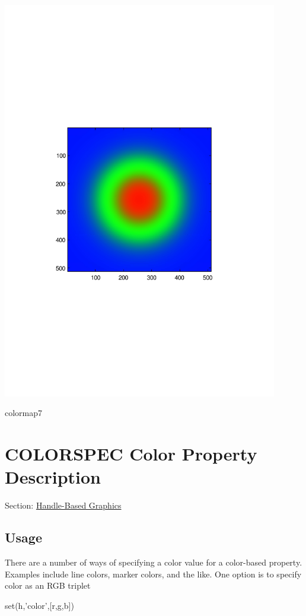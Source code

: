  
\begin{DoxyImage}
\includegraphics[width=12cm]{colormap7}
\caption{colormap7}
\end{DoxyImage}
 \hypertarget{handle_colorspec}{}\section{C\-O\-L\-O\-R\-S\-P\-E\-C Color Property Description}\label{handle_colorspec}
Section\-: \hyperlink{sec_handle}{Handle-\/\-Based Graphics} \hypertarget{vtkwidgets_vtkxyplotwidget_Usage}{}\subsection{Usage}\label{vtkwidgets_vtkxyplotwidget_Usage}
There are a number of ways of specifying a color value for a color-\/based property. Examples include line colors, marker colors, and the like. One option is to specify color as an R\-G\-B triplet \begin{DoxyVerb}   set(h,'color',[r,g,b])
\end{DoxyVerb}
